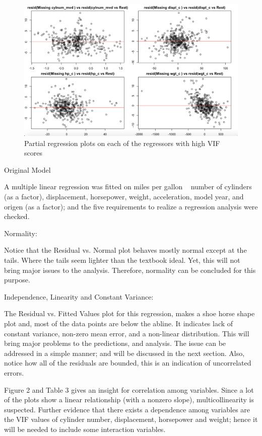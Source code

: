 \documentclass{article}
\begin{document}
\begin{figure}
	\centering
	\includegraphics[width=1\linewidth]{11-14p_PrRgall4}
	\caption[Partial regression plots on high VIF regressors]
	{Partial regression plots on each of the regressors with high VIF scores}
\end{figure}

\clearpage
\newpage

Original Model

A multiple linear regression was fitted on miles per gallon ~ number of cylinders (as a factor), displacement, horsepower, weight, acceleration, model year, and origen (as a factor); and the five requirements to realize a regression analysis were checked.

Normality: 

Notice that the Residual vs. Normal plot behaves mostly normal except at the tails. Where the tails seem lighter than the textbook ideal. Yet, this will not bring major issues to the analysis. Therefore, normality can be concluded for this purpose.

Independence, Linearity and Constant Variance:

The Residual vs. Fitted Values plot for this regression,  makes a shoe horse shape plot and, most of the data points are below the abline. It indicates lack of constant variance, non-zero mean error, and a non-linear distribution. This will bring major problems to the predictions, and analysis.  The issue can be addressed in a simple manner; and will be discussed in the next section. Also, notice how all of the residuals are bounded, this is an indication of uncorrelated errors.

Figure 2 and Table 3 gives an insight for correlation among variables. Since a lot of the plots show a linear relationship (with a nonzero slope), multicollinearity is suspected. Further evidence that there exists a dependence among variables are the VIF values of cylinder number, displacement, horsepower and weight; hence it will be needed to include some interaction variables. 
\end{document}
